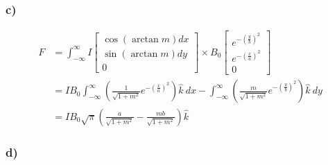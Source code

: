 \documentclass[../homework.tex]{subfiles}
\begin{document}
\subsubsection*{c)}
\begin{align*}
    F &= \int_{-\infty}^{\infty} I
      \begin{bmatrix}
          \cos{(\arctan{m})} dx \\
          \sin{(\arctan{m})} dy \\
          0
      \end{bmatrix} \times B_0
      \begin{bmatrix}
        e^{-\left(\frac{y}{b}\right)^2} \\
        e^{-\left(\frac{x}{a}\right)^2} \\
        0
    \end{bmatrix} \\
    &= I B_0 \int_{-\infty}^{\infty} \left(
        \frac{1}{\sqrt{1+m^2}} e^{-\left(\frac{x}{a}\right)^2} \right)\hat{k}~dx - \int_{-\infty}^{\infty} \left(\frac{m}{\sqrt{1+m^2}} e^{-\left(\frac{y}{b}\right)^2}
    \right)\hat{k}~dy  \\
    &= I B_0 \sqrt{\pi} \left(\frac{a}{\sqrt{1 + m^2}} - \frac{mb}{\sqrt{1 + m^2}} \right) \hat{k}
\end{align*}


\subsubsection*{d)}
\end{document}
